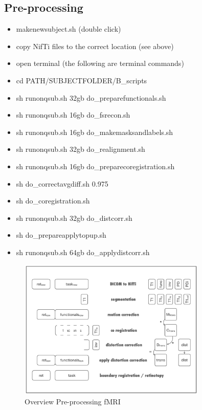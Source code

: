 \documentclass[12pt,a4paper]{scrartcl}
\begin{document}
\subsection{Pre-processing}
\begin{itemize}
\item makenewsubject.sh (double click)
\item copy NifTi files to the correct location (see above)
\item open terminal (the following are terminal commands)
\item cd PATH/SUBJECTFOLDER/B\_scripts
\item sh runonqsub.sh 32gb do\_preparefunctionals.sh
\item sh runonqsub.sh 16gb do\_fsrecon.sh
\item sh runonqsub.sh 16gb do\_makemasksandlabels.sh
\item sh runonqsub.sh 32gb do\_realignment.sh
\item sh runonqsub.sh 16gb do\_preparecoregistration.sh
\item sh do\_correctavgdiff.sh 0.975
\item sh do\_coregistration.sh
\item sh runonqsub.sh 32gb do\_distcorr.sh
\item sh do\_prepareapplytopup.sh
\item sh runonqsub.sh 64gb do\_applydistcorr.sh
\end{itemize}
\begin{figure}[h]
\begin{center}
\includegraphics[width=0.8\textwidth]{overviewpreprocmain}
\caption[Overview Pre-processing fMRI]{Overview Pre-processing fMRI}
\end{center}
\end{figure}
\end{document}

